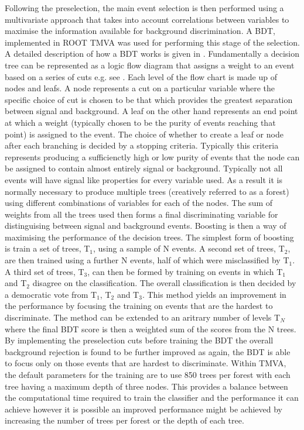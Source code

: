 Following the preselection, the main event selection is then performed using a multivariate approach that takes into account correlations between variables to maximise the information available for background discrimination. A \ac{BDT}, implemented in ROOT TMVA \cite{2007physics...3039H} was used for performing this stage of the selection. A detailed description of how a BDT works is given in \cite{Coadou:2013lca}. Fundamentally a decision tree can be represented as a logic flow diagram that assigns a weight to an event based on a series of cuts e.g. see . Each level of the flow chart is made up of nodes and leafs. A node represents a cut on a particular variable where the specific choice of cut is chosen to be that which provides the greatest separation between signal and background. A leaf on the other hand represents an end point at which a weight (typically chosen to be the purity of events reaching that point) is assigned to the event. The choice of whether to create a leaf or node after each branching is decided by a stopping criteria. Typically this criteria represents producing a sufficienctly high or low purity of events that the node can be assigned to contain almost entirely signal or background. Typically not all events will have signal like properties for every variable used. As a result it is normally necessary to produce multiple trees (creatively referred to as a forest) using different combinations of variables for each of the nodes. The sum of weights from all the trees used then forms a final discriminating variable for distinguising between signal and background events. Boosting is then a way of maximising the performance of the decision trees. The simplest form of boosting is train a set of trees, T$_1$, using a sample of N events. A second set of trees, T$_2$, are then trained using a further N events, half of which were misclassified by T$_1$. A third set of trees, T$_3$,  can then be formed by training on events in which T$_1$ and T$_2$ disagree on the classification. The overall classification is then decided by a democratic vote from T$_1$, T$_2$ and T$_3$. This method yields an improvement in the performance by focusing the training on events that are the hardest to discriminate. The method can be extended to an aritrary number of levels T$_N$ where the final \ac{BDT} score is then a weighted sum of the scores from the N trees. By implementing the preselection cuts before training the \ac{BDT} the overall background rejection is found to be further improved as again, the \ac{BDT} is able to focus only on those events that are hardest to discriminate. Within TMVA, the default parameters for the training are to use 850 trees per forest with each tree having a maximum depth of three nodes. This provides a balance between the computational time required to train the classifier and the performance it can achieve however it is possible an improved performance might be achieved by increasing the number of trees per forest or the depth of each tree. 

